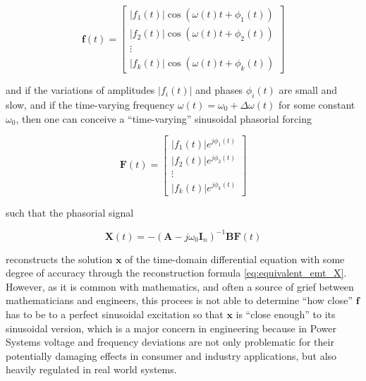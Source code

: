 \begin{equation} \mathbf{f}(t) = \left[\begin{array}{c} \left\lvert f_1(t)\right\rvert\cos\left(\omega(t)t + \phi_1(t)\right) \\[3mm] \left\lvert f_2(t)\right\rvert\cos\left(\omega(t)t + \phi_2(t)\right) \\[3mm] \vdots \\[3mm] \left\lvert f_k(t)\right\rvert\cos\left(\omega(t)t + \phi_k(t)\right)\end{array}\right]\end{equation}

	\noindent and if the variations of amplitudes $\left\lvert f_i(t)\right\rvert$ and phases $\phi_i(t)$ are small and slow, and if the time-varying frequency $\omega(t) = \omega_0 + \Delta\omega(t)$ for some constant $\omega_0$, then one can conceive a ``time-varying'' sinusoidal phasorial forcing

\begin{equation} \mathbf{F}(t) = \left[\begin{array}{c} \left\lvert f_1(t)\right\rvert e^{j\phi_1(t)} \\[3mm] \left\lvert f_2(t)\right\rvert  e^{j\phi_2(t)}\\[3mm] \vdots \\[3mm] \left\lvert f_k(t)\right\rvert  e^{j\phi_k(t)} \end{array}\right]\end{equation}

	\noindent such that the phasorial signal

\begin{equation} \mathbf{X}(t) = -\left(\mathbf{A} - j\omega_0\mathbf{I}_n \right)^{-1}\mathbf{BF}(t) \label{eq:lincircuit_ode_phasor_steadystate} \end{equation}

	\noindent reconstructs the solution $\mathbf{x}$ of the time-domain differential equation with some degree of accuracy through the reconstruction formula \eqref{eq:equivalent_emt_X}. However, as it is common with mathematics, and often a source of grief between mathematicians and engineers, this procees is not able to determine ``how close'' $\mathbf{f}$ has to be to a perfect sinusoidal excitation so that $\mathbf{x}$ is ``close enough'' to its sinusoidal version, which is a major concern in engineering because in Power Systems voltage and frequency deviations are not only problematic for their potentially damaging effects in consumer and industry applications, but also heavily regulated in real world systems.

